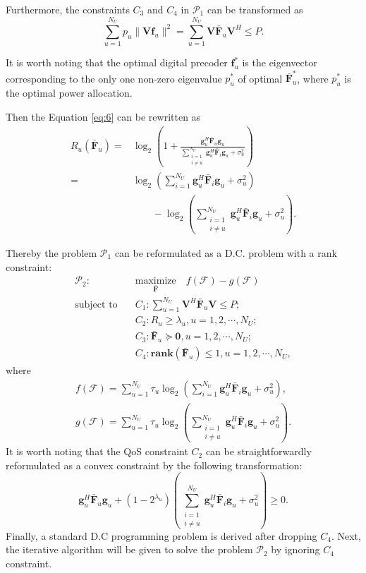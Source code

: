 \documentclass[10pt,journal,twocolumn,twoside]{IEEEtran}
\begin{document}
 Furthermore, the constraints $C_3$ and $C_4$ in $\mathcal{P}_1$ can be transformed as
\begin{equation}
 \sum_{u=1}^{N_U} p_u\|\bm{V} \bm{f}_{u}\|^2 = \sum_{u=1}^{N_U}\bm{V} \bar{\bm{F}}_u\bm{V} ^H \leq P.
\end{equation}

It is worth noting that the optimal digital precoder $\bm{f}_{u}^*$ is the eigenvector corresponding to the only one non-zero eigenvalue $p^*_u$ of optimal $\bar{\bm{F}}_u^*$, where $p^*_u$ is the optimal power allocation.

Then the Equation \eqref{eq:6} can be rewritten as
\begin{align}\label{eq:newR}
R_u(\bar{\bm{F}}_u) =& \log_2\left(1+\frac{\bm{g}_{u}^H \bar{\bm{F}}_u\bm{g}_{u}}{\sum_{\substack{i=1 \\ i\neq u}}^{N_U}{\bm{g}}_{u}^H\bar{\bm{F}}_i\bm{g}_u+\sigma_u^2}\right)\nonumber\\
=&\log_2\left(\sum_{i=1}^{N_U}\bm{g}_{u}^H \bar{\bm{F}}_i\bm{g}_{u} + \sigma_u^2\right) \nonumber\\
&\qquad -\log_2\left(\sum_{\substack{i=1 \\ i\neq u}}^{N_U}{\bm{g}}_{u}^H\bar{\bm{F}}_i\bm{g}_u+\sigma_u^2 \right).
\end{align}

Thereby the problem $\mathcal{P}_1$ can be reformulated as a D.C. problem with a rank constraint:
\begin{align}\label{eq:maxR}
\mathcal{P}_2: \quad&\underset{\bar{\bm{F}}}{\text{maximize}}\quad f(\bm{\mathcal{F}}) - g(\bm{\mathcal{F}})\\ \nonumber
\text{subject to} \quad&C_1: \sum_{u=1}^{N_U}\bm{V}^H \bar{\bm{F}}_u\bm{V} \leq P;\nonumber\\
&C_2: R_{u}\geq \lambda_{u}, u = 1,2,\cdots, N_U;\nonumber\\
&C_3: \bar{\bm{F}}_{u} \succeq \bm{0}, u = 1,2,\cdots, N_U; \nonumber\\
&C_4: \textbf{rank}(\bm{\bar{F}}_{u})\leq 1, u = 1,2,\cdots, N_U, \nonumber
\end{align}
where
\begin{align}
	f(\bm{\mathcal{F}}) = \sum_{u=1}^{N_U}\tau_u\log_2\left(\sum_{i=1}^{N_U}\bm{g}_{u}^H \bar{\bm{F}}_i\bm{g}_{u} + \sigma_u^2\right),\\
    g(\bm{\mathcal{F}}) = \sum_{u=1}^{N_U}\tau_u \log_2\left(\sum_{\substack{i=1 \\ i\neq u}}^{N_U}{\bm{g}}_{u}^H\bar{\bm{F}}_i\bm{g}_u+\sigma_u^2 \right).
\end{align}
It is worth noting that the QoS constraint $C_2$ can be straightforwardly reformulated as a convex constraint by the following transformation:
\begin{equation}
	\bm{g}_{u}^H \bar{\bm{F}}_u\bm{g}_{u} + (1-2^{\lambda_{u}}) \left( \sum_{\substack{i=1 \\ i\neq u}}^{N_U} \bm{g}_{u}^H \bar{\bm{F}}_i\bm{g}_{u} + \sigma_u^2 \right) \geq 0.
\end{equation}
Finally, a standard D.C programming problem is derived after dropping $C_4$. Next, the iterative algorithm will be given to solve the problem $\mathcal{P}_2$ by ignoring $C_4$ constraint.
\end{document}
